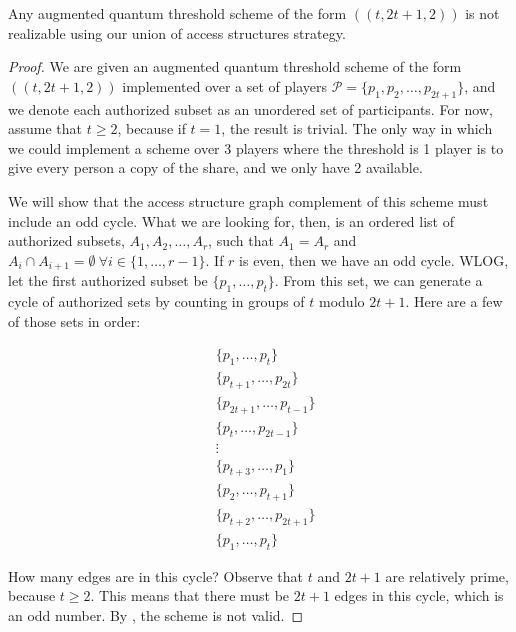 \begin{theorem}
    \label{thm:t-2t+1-2}
    Any augmented quantum threshold scheme of the form $((t,2t+1,2))$ is not realizable using our union of  access structures strategy.
\end{theorem}
 
\begin{proof}
    We are given an augmented quantum threshold scheme of the form $((t,2t+1,2))$ implemented over a set of players $\mathcal{P} = \{p_1,p_2,\dots,p_{2t+1}\}$, and we denote each authorized subset as an unordered set of participants. For now, assume that $t \geq 2$, because if $t=1$, the result is trivial. The only way in which we could implement a scheme over 3 players where the threshold is 1 player is to give every person a copy of the share, and we only have 2 available. 
    
    We will show that the access structure graph complement of this scheme must include an odd cycle. What we are looking for, then, is an ordered list of authorized subsets, $A_1, A_2, \dots, A_r$, such that $A_1=A_r$ and $A_i \cap A_{i+1} = \emptyset \: \forall i \in \{1,\dots,r-1\}$. If $r$ is even, then we have an odd cycle. WLOG, let the first authorized subset be $\{p_1,\dots,p_{t}\}$. From this set, we can generate a cycle of authorized sets by counting in groups of $t$ modulo $2t+1$. Here are a few of those sets in order:
    
    \begin{align*}
        &\{p_1,\dots,p_{t}\} \\ 
        &\{p_{t+1},\dots,p_{2t}\} \\ 
        &\{p_{2t+1},\dots,p_{t-1}\} \\ 
        &\{p_{t},\dots,p_{2t-1}\} \\
        & \vdots \\
        &\{p_{t+3},\dots,p_{1}\} \\ 
        &\{p_{2},\dots,p_{t+1}\} \\ 
        &\{p_{t+2},\dots,p_{2t+1}\} \\ 
        &\{p_1,\dots,p_{t}\}
    \end{align*}
    
    How many edges are in this cycle? Observe that $t$ and $2t+1$ are relatively prime, because $t \geq 2$. This means that there must be $2t+1$ edges in this cycle, which is an odd number. By , the scheme is not valid.
\end{proof}





